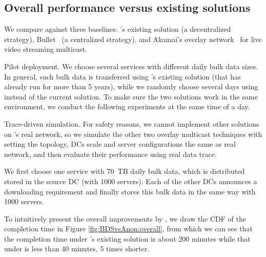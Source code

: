 \subsection{Overall performance versus existing solutions}
\label{subsec:evaluation:centralized}

We compare \name against three baselines:
\company's existing solution (a decentralized strategy),
Bullet~\cite{kostic2003bullet} (a centralized strategy), and
Akamai's overlay network~\cite{Andreev2013Designing} for live video streaming
multicast.


Pilot deployment. We choose several services with different daily bulk data sizes. In general, such bulk data is transferred using \company's existing solution (that has already run for more than 5 years), while we randomly choose several days using \name instead of the current solution. To make sure the two solutions work in the same environment, we conduct the following experiments at the same time of a day.

Trace-driven simulation. For safety reasons, we cannot implement other solutions on \company's real network, so we simulate the other two overlay multicast techniques with setting the topology, DCs scale and server configurations the same as real network, and then evaluate their performance using real data trace.




We first choose one service with 70~TB daily bulk data, which is distributed stored in the source DC (with 1000 servers). Each of the other DCs announces a downloading requirement and finally stores this bulk data in the same way with 1000 servers.


To intuitively present the overall improvements by \name, we draw the CDF of the completion time in Figure \ref{fig:BDSvsAnon:overall}, from which we can see that the completion time under \company's existing solution is about 200 minutes while that under \name is less than 40 minutes, 5 times shorter.

